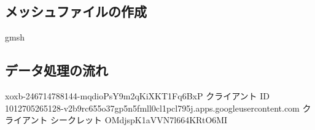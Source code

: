\subsection{メッシュファイルの作成}
gmsh
\subsection{データ処理の流れ}

xoxb-246714788144-mqdioPsY9m2qKiXKT1Fq6BxP
クライアント ID
1012705265128-v2b9rc655o37gp5n5fmll0cl1pcl795j.apps.googleusercontent.com
クライアント シークレット
OMdjspK1aVVN7l664KRtO6MI
